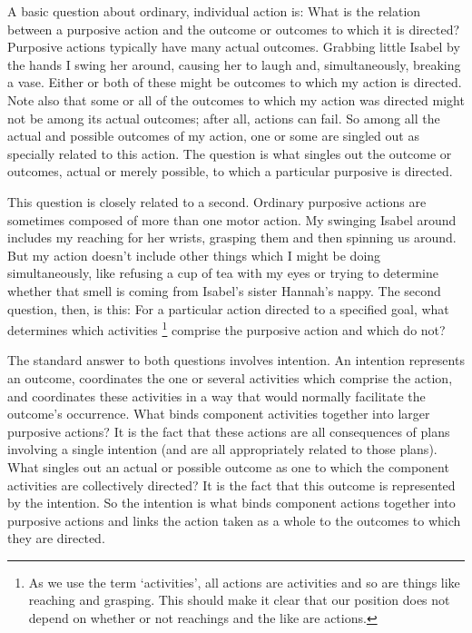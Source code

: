 \documentclass[12pt,\papersize]{extarticle}
\begin{document}
A basic question about ordinary, individual action is:
What is the relation between a purposive action and the outcome or outcomes to which it is directed?
Purposive actions typically have many actual outcomes.
Grabbing little Isabel by the hands I swing her around, causing her to laugh and, simultaneously, breaking a vase.
Either or both of these might be outcomes to which my action is directed.
Note also that some or all of the outcomes to which my action was directed might not be among its actual outcomes; after all, actions can fail.
So among all the actual and possible outcomes of my action, one or some are singled out as specially related to this action.
The question is what singles out the outcome or outcomes, actual or merely possible, to which a particular purposive is directed.

This question is closely related to a second.
Ordinary purposive actions are sometimes composed of more than one motor action.  My swinging Isabel around includes my reaching for her wrists, grasping them and then spinning us around.  
But  my action doesn’t include other things which I might be doing simultaneously, like refusing a cup of tea with my eyes or  trying to determine whether that smell is coming from Isabel’s sister Hannah’s nappy.
The second question, then, is this: For a particular action directed to a specified goal, what determines which activities%
\footnote{
As we use the term `activities',
all actions are activities 
and so are  things like reaching and grasping.
This should make it clear that our position does not depend on whether or not reachings and the like are  actions.
} comprise the purposive action and which do not?


The standard answer to both questions involves intention.
An intention represents an outcome, coordinates the one or several activities which comprise the action, and coordinates these activities in a way that would normally facilitate the outcome's occurrence.
What binds component activities together into larger purposive actions?  
It is the fact that these actions are all consequences of plans involving a single intention (and are all appropriately related to those plans).
What singles out an actual or possible outcome as one to which the component activities are collectively directed?  
It is the fact that this outcome is represented by the intention.
So the intention is what binds component actions together into purposive actions and links the action taken as a whole to the outcomes to which they are directed.
\end{document}
